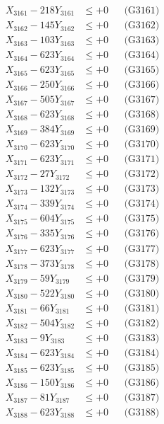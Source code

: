 \documentclass[a4paper,10pt]{article}
\begin{document}
{\begin{align}
\allowbreak
X_{3161} - 218Y_{3161} &\leq +0 && \text{(G3161)} \\
X_{3162} - 145Y_{3162} &\leq +0 && \text{(G3162)} \\
X_{3163} - 103Y_{3163} &\leq +0 && \text{(G3163)} \\
X_{3164} - 623Y_{3164} &\leq +0 && \text{(G3164)} \\
X_{3165} - 623Y_{3165} &\leq +0 && \text{(G3165)} \\
X_{3166} - 250Y_{3166} &\leq +0 && \text{(G3166)} \\
X_{3167} - 505Y_{3167} &\leq +0 && \text{(G3167)} \\
X_{3168} - 623Y_{3168} &\leq +0 && \text{(G3168)} \\
X_{3169} - 384Y_{3169} &\leq +0 && \text{(G3169)} \\
X_{3170} - 623Y_{3170} &\leq +0 && \text{(G3170)} \\
\allowbreak
X_{3171} - 623Y_{3171} &\leq +0 && \text{(G3171)} \\
X_{3172} - 27Y_{3172} &\leq +0 && \text{(G3172)} \\
X_{3173} - 132Y_{3173} &\leq +0 && \text{(G3173)} \\
X_{3174} - 339Y_{3174} &\leq +0 && \text{(G3174)} \\
X_{3175} - 604Y_{3175} &\leq +0 && \text{(G3175)} \\
X_{3176} - 335Y_{3176} &\leq +0 && \text{(G3176)} \\
X_{3177} - 623Y_{3177} &\leq +0 && \text{(G3177)} \\
X_{3178} - 373Y_{3178} &\leq +0 && \text{(G3178)} \\
X_{3179} - 59Y_{3179} &\leq +0 && \text{(G3179)} \\
X_{3180} - 522Y_{3180} &\leq +0 && \text{(G3180)} \\
\allowbreak
X_{3181} - 66Y_{3181} &\leq +0 && \text{(G3181)} \\
X_{3182} - 504Y_{3182} &\leq +0 && \text{(G3182)} \\
X_{3183} - 9Y_{3183} &\leq +0 && \text{(G3183)} \\
X_{3184} - 623Y_{3184} &\leq +0 && \text{(G3184)} \\
X_{3185} - 623Y_{3185} &\leq +0 && \text{(G3185)} \\
X_{3186} - 150Y_{3186} &\leq +0 && \text{(G3186)} \\
X_{3187} - 81Y_{3187} &\leq +0 && \text{(G3187)} \\
X_{3188} - 623Y_{3188} &\leq +0 && \text{(G3188)} \\

\end{align}}
\end{document}
